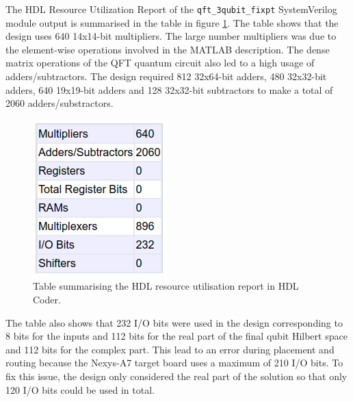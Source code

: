 The HDL Resource Utilization Report of the \texttt{qft\_3qubit\_fixpt} SystemVerilog module output is summarised in the table in figure \ref{fig:qft-hdl-res-report}. The table shows that the design uses 640 14x14-bit multipliers. The large number multipliers was due to the element-wise operations involved in the MATLAB description. The dense matrix operations of the QFT quantum circuit also led to a high usage of adders/subtractors. The design required 812 32x64-bit adders, 480 32x32-bit adders, 640 19x19-bit adders and 128 32x32-bit subtractors to make a total of 2060 adders/substractors.
\begin{figure}[!ht]
	\centering
	\includegraphics[width=0.45\linewidth]{body/ch6/figs/qft-hdl-res-report}
	\caption[Table Summarising the HDL Resource Utilisation Report in HDL Coder.]{Table summarising the HDL resource utilisation report in HDL Coder.}
	\label{fig:qft-hdl-res-report}
\end{figure}
The table also shows that 232 I/O bits were used in the design corresponding to 8 bits for the inputs and 112 bits for the real part of the final qubit Hilbert space and 112 bits for the complex part. This lead to an error during placement and routing because the Nexys-A7 target board uses a maximum of 210 I/O bits. To fix this issue, the design only considered the real part of the solution so that only 120 I/O bits could be used in total. 

